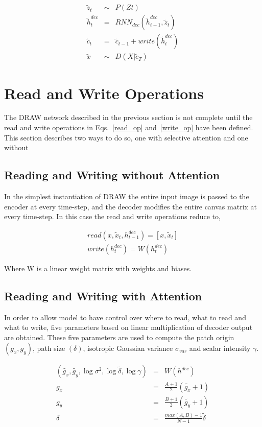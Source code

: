 \documentclass{scrartcl}
\begin{document}
\begin{eqnarray}
  \tilde{z}_t &\sim& P(Zt) \\
  \tilde{h}^{dec}_t &=& RNN_{dec}(\tilde{h}^{dec}_{t−1}, \tilde{z}_t) \\
  \tilde{c}_t &=& \tilde{c}_{t−1} + write(\tilde{h}^{dec}_t) \\
  \tilde{x} &\sim& D(X|\tilde{c}_T)
\end{eqnarray}

\section{Read and Write Operations}
The DRAW network described in the previous section is
not complete until the read and write operations in Eqs.~\ref{read_op}
and~\ref{write_op} have been defined. This section describes two ways
to do so, one with selective attention and one without

\subsection{Reading and Writing without Attention}

In the simplest instantiation of DRAW the entire input image is passed to the encoder at every time-step, and the decoder modifies the entire canvas matrix at every time-step.
In this case the read and write operations reduce to,

\begin{eqnarray}
  read(x, \tilde{x}_t, h^{dec}_{t−1}) = [x, \tilde{x}_t] \\
  write(h^{dec}_t) = W(h^{dec}_t)
\end{eqnarray}

Where W is a linear weight matrix with weights and biases.

\subsection{Reading and Writing with Attention}
In order to allow model to have control over where to read, what to read and what to write, five parameters based on linear multiplication of decoder output are obtained. These five parameters are used to compute the patch origin $(g_x, g_y)$, path size $(\delta)$, isotropic Gaussian variance $\sigma_{var}$ and scalar intensity $\gamma$.

\begin{eqnarray}
  (\tilde{g_x}, \tilde{g_y} , \log\sigma^2 , \log\tilde{δ}, \log\gamma ) &=& W (h^{dec}) \\
  g_x &=& \frac{A + 1}{2} (\tilde{g_x} + 1) \\
  g_y &=& \frac{B + 1}{2} (\tilde{g_y} + 1) \\
  \delta &=& \frac{max(A, B) - 1}{N - 1} \tilde{\delta}
\end{eqnarray}
\end{document}
